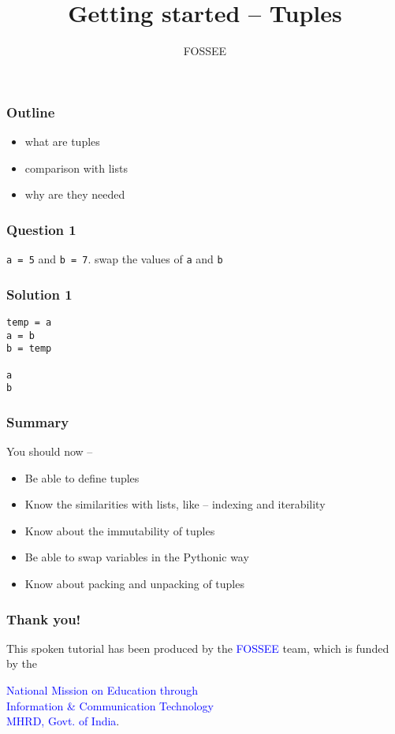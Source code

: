 \documentclass[presentation]{beamer}
\title{Getting started -- Tuples}
\author{FOSSEE}
\date{}
\begin{document}
\maketitle









\begin{frame}
\frametitle{Outline}
\label{sec-1}

\begin{itemize}
\item what are tuples
\item comparison with lists
\item why are they needed
\end{itemize}
\end{frame}
\begin{frame}
\frametitle{Question 1}
\label{sec-2}

  \texttt{a = 5} and \texttt{b = 7}. swap the values of \texttt{a} and \texttt{b}
\end{frame}
\begin{frame}[fragile]
\frametitle{Solution 1}
\label{sec-3}

\lstset{language=Python}
\begin{lstlisting}
temp = a
a = b
b = temp

a
b
\end{lstlisting}
\end{frame}
\begin{frame}
\frametitle{Summary}
\label{sec-4}

  You should now --
\begin{itemize}
\item Be able to define tuples
\item Know the similarities with lists, like -- indexing and iterability
\item Know about the immutability of tuples
\item Be able to swap variables in the Pythonic way
\item Know about packing and unpacking of tuples
\end{itemize}
\end{frame}
\begin{frame}
\frametitle{Thank you!}
\label{sec-5}

  \begin{block}{}
  \begin{center}
  This spoken tutorial has been produced by the
  \textcolor{blue}{FOSSEE} team, which is funded by the 
  \end{center}
  \begin{center}
    \textcolor{blue}{National Mission on Education through \\
      Information \& Communication Technology \\ 
      MHRD, Govt. of India}.
  \end{center}  
  \end{block}
\end{frame}
\end{document}
